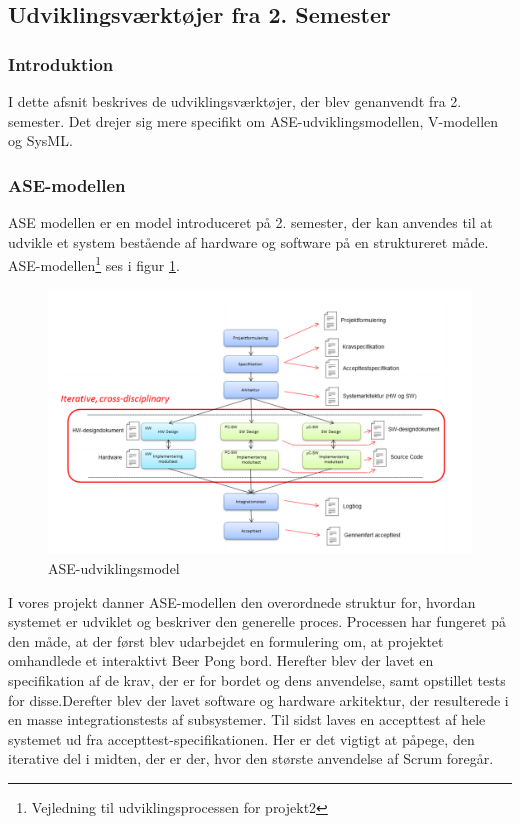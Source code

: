 \documentclass[a4paper,12pt,fleqn,oneside]{article}
\begin{document}
\subsection{Udviklingsværktøjer fra 2. Semester}\label{sec:second_semester_tools}
\subsubsection{Introduktion}
I dette afsnit beskrives de udviklingsværktøjer, der blev genanvendt fra 2. semester. Det drejer sig mere specifikt om ASE-udviklingsmodellen, V-modellen og SysML.
\subsubsection{ASE-modellen}
ASE modellen er en model introduceret på 2. semester, der kan anvendes til at udvikle et system bestående af hardware og software på en struktureret måde. ASE-modellen\footnote{Vejledning til udviklingsprocessen for projekt2} ses i figur \ref{fig:ASE_model}.
\begin{figure}[H]
    \centering
    \includegraphics[width=\textwidth]{Processdokument/graphics/ASE_model.png}
    \caption{ASE-udviklingsmodel}
    \label{fig:ASE_model}
\end{figure}
I vores projekt danner ASE-modellen den overordnede struktur for, hvordan systemet er udviklet og beskriver den generelle proces. Processen har fungeret på den måde, at der først blev udarbejdet en formulering om, at projektet omhandlede et interaktivt Beer Pong bord. Herefter blev der lavet en specifikation af de krav, der er for bordet og dens anvendelse, samt opstillet tests for disse.Derefter blev der lavet software og hardware arkitektur, der resulterede i en masse integrationstests af subsystemer. Til sidst laves en accepttest af hele systemet ud fra accepttest-specifikationen. Her er det vigtigt at påpege, den iterative del i midten, der er der, hvor den største anvendelse af Scrum foregår.
\end{document}
